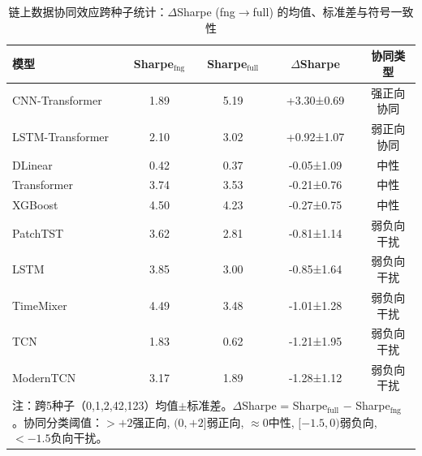 \begin{table}[ht]
\centering
\caption{链上数据协同效应跨种子统计：$\Delta$Sharpe (fng$\to$full) 的均值、标准差与符号一致性}
\label{tab:delta_multi_seed}
\small
\begin{tabular}{lcccc}
\toprule
模型 & Sharpe$_{\text{fng}}$ & Sharpe$_{\text{full}}$ & $\Delta$Sharpe & 协同类型 \\
\midrule
CNN-Transformer & 1.89 & 5.19 & +3.30±0.69 & 强正向协同 \\
LSTM-Transformer & 2.10 & 3.02 & +0.92±1.07 & 弱正向协同 \\
DLinear & 0.42 & 0.37 & -0.05±1.09 & 中性 \\
Transformer & 3.74 & 3.53 & -0.21±0.76 & 中性 \\
XGBoost & 4.50 & 4.23 & -0.27±0.75 & 中性 \\
PatchTST & 3.62 & 2.81 & -0.81±1.14 & 弱负向干扰 \\
LSTM & 3.85 & 3.00 & -0.85±1.64 & 弱负向干扰 \\
TimeMixer & 4.49 & 3.48 & -1.01±1.28 & 弱负向干扰 \\
TCN & 1.83 & 0.62 & -1.21±1.95 & 弱负向干扰 \\
ModernTCN & 3.17 & 1.89 & -1.28±1.12 & 弱负向干扰 \\
\bottomrule
\multicolumn{5}{p{0.85\textwidth}}{\footnotesize 注：跨5种子（0,1,2,42,123）均值$\pm$标准差。$\Delta$Sharpe = Sharpe$_{\text{full}}$ $-$ Sharpe$_{\text{fng}}$。协同分类阈值：$>+2$强正向, $(0, +2]$弱正向, $\approx 0$中性, $[-1.5,0)$弱负向, $<-1.5$负向干扰。}
\end{tabular}
\end{table}